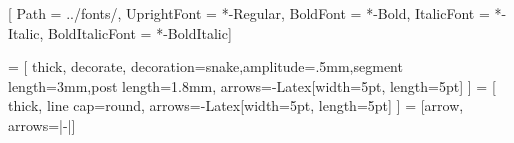 \usepackage{tikz}
\usepackage{fontawesome5}
\usepackage{fontspec}
\usepackage{color}
\usepackage{csquotes}
\usepackage{xspace}
\RequirePackage[scaled=.9]{FiraMono}
\usetikzlibrary{
    calc,
    arrows.meta,
    decorations.pathmorphing,
    positioning,
    shapes.geometric,
    tikzmark
}


\setmainfont{TeXGyreTermes}[
    Path = ../fonts/,
    UprightFont = *-Regular,
    BoldFont = *-Bold,
    ItalicFont = *-Italic,
    BoldItalicFont = *-BoldItalic]

 = [
  thick, decorate,
  decoration={snake,amplitude=.5mm,segment length=3mm,post length=1.8mm},
  arrows={-Latex[width=5pt, length=5pt]}
]
  = [
  thick, line cap=round,
  arrows={-Latex[width=5pt, length=5pt]}
]
  = [arrow, arrows={|-|}]
